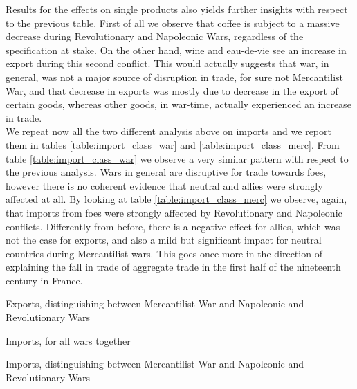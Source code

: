 \documentclass[12pt,a4paper,notitlepage,english]{article}
\begin{document}
Results for the effects on single products also yields further insights with respect to the previous table.
First of all we observe that coffee is subject to a massive decrease during Revolutionary and  Napoleonic Wars, regardless of the specification at stake.
On the other hand, wine and eau-de-vie see an increase in export during this second conflict.
This would actually suggests that war, in general, was not a major source of disruption in trade, for sure not Mercantilist War, and that decrease in exports was mostly due to decrease in the export of certain goods, whereas other goods, in war-time, actually experienced an increase in trade.\\
We repeat now all the two different analysis above on imports and we report them in tables \ref{table:import_class_war} and \ref{table:import_class_merc}.
From table \ref{table:import_class_war} we observe a very similar pattern with respect to the previous analysis.
Wars in general are disruptive for trade towards foes, however there is no coherent evidence that neutral and allies were strongly affected at all.
By looking at table \ref{table:import_class_merc} we observe, again, that imports from foes were strongly affected by Revolutionary and Napoleonic conflicts.
Differently from before, there is a negative effect for allies, which was not the case for exports, and also a mild but significant impact for neutral countries during Mercantilist wars.
This goes once more in the direction of explaining the fall in trade of aggregate trade in the first half of the nineteenth century in France.
\begin{table}
\begin{center}
\caption {Exports, distinguishing between Mercantilist War and Napoleonic and Revolutionary Wars} \label{table:export_class_merc}
\renewcommand{\arraystretch}{0.6}

\end{center}
\end{table}
\begin{table}
\begin{center}
\caption {Imports, for all wars together} 
\label{table:import_class_war}
\renewcommand{\arraystretch}{0.6}

\end{center}
\end{table}
\begin{table}
\begin{center}
\caption {Imports, distinguishing between Mercantilist War and Napoleonic and Revolutionary Wars} \label{table:import_class_merc}
\renewcommand{\arraystretch}{0.6}

\end{center}
\end{table}
\fi
\end{document}

